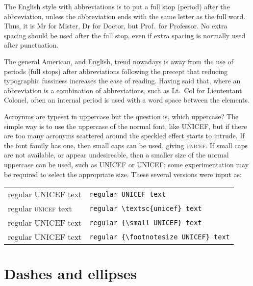 \documentclass[10pt,a4paper,extrafontsizes]{memoir}
\begin{document}
\begin{paracol}{2}
\switchEng
    The English style with abbreviations is to put a full stop (period) after
the abbreviation, unless the abbreviation ends with the same letter as the
full word. Thus, it is Mr for Mister, Dr for Doctor, but Prof.~for Professor.
No extra spacing should be used after the full stop, even if extra
spacing is normally used after punctuation.

    The general American, and English, trend nowadays is away from the use 
of periods (full stops) after abbreviations following the precept that
reducing typographic fussiness increases the ease of reading. Having said that,
where an abbreviation is a combination of abbreviations, such as Lt.~Col for
Lieutentant Colonel, often an internal period is used with a word space
between the elements.

    Acroynms are typeset in uppercase but the 
question is, which uppercase?
The simple way is to use the uppercase of the normal font, like UNICEF, but
if there are too many acronyms scattered around the speckled effect starts
to intrude. If the font family has one, then small caps can be used,
giving \textsc{unicef}. If small caps are not available, or appear
undesireable, then a smaller size of the normal uppercase can be used,
such as {\small UNICEF} or {\footnotesize UNICEF}; some experimentation
may be required to select the appropriate size. These several versions
were input as:\par
\begin{tabular}{ll}
regular UNICEF text & \verb?regular UNICEF text? \\
regular \textsc{unicef} text & \verb?regular \textsc{unicef} text? \\
regular {\small UNICEF} text & \verb?regular {\small UNICEF} text? \\
regular {\footnotesize UNICEF} text & \verb?regular {\footnotesize UNICEF} text? 
\end{tabular}
\end{paracol}

\section{Dashes and ellipses}
\end{document}
